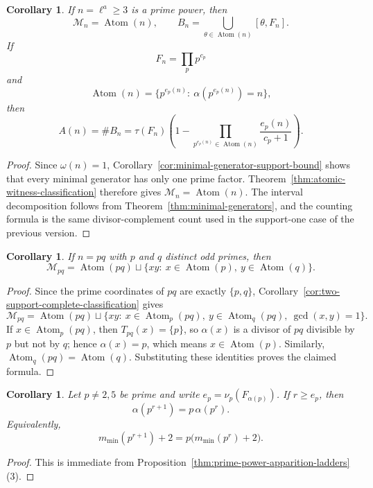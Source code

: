 \documentclass[11pt,letterpaper]{article}
\numberwithin{equation}{section}
\theoremstyle{plain}
\newtheorem{corollary}[theorem]{Corollary}
\theoremstyle{definition}
\theoremstyle{remark}
\DeclareMathOperator{\Atom}{Atom}
\begin{document}
\begin{corollary}
\label{thm:prime-power-minimal-generators}
If $n=\ell^a\ge 3$ is a prime power, then
\[
\mathcal M_n=\Atom(n),
\qquad
B_n=\bigcup_{\theta\in \Atom(n)}[\theta,F_n].
\]
If
\[
F_n=\prod_p p^{c_p}
\]
and
\[
\Atom(n)=\{p^{e_p(n)}:\ \alpha(p^{e_p(n)})=n\},
\]
then
\[
A(n)=\#B_n
=
\tau(F_n)\left(
1-\prod_{p^{e_p(n)}\in\Atom(n)}
\frac{e_p(n)}{c_p+1}
\right).
\]
\end{corollary}

\begin{proof}
Since $\omega(n)=1$, Corollary~\ref{cor:minimal-generator-support-bound} shows
that every minimal generator has only one prime factor. Theorem~\ref{thm:atomic-witness-classification}
therefore gives $\mathcal M_n=\Atom(n)$. The interval decomposition follows
from Theorem~\ref{thm:minimal-generators}, and the counting formula is the same
divisor-complement count used in the support-one case of the previous version.
\end{proof}

\begin{corollary}
\label{thm:odd-semiprime-minimal-generators}
If $n=pq$ with $p$ and $q$ distinct odd primes, then
\[
\mathcal M_{pq}
=
\Atom(pq)
\sqcup
\{xy:\ x\in\Atom(p),\ y\in\Atom(q)\}.
\]
\end{corollary}

\begin{proof}
Since the prime coordinates of $pq$ are exactly $\{p,q\}$,
Corollary~\ref{cor:two-support-complete-classification} gives
\[
\mathcal M_{pq}
=
\Atom(pq)
\sqcup
\{xy:\ x\in\Atom_p(pq),\ y\in\Atom_q(pq),\ \gcd(x,y)=1\}.
\]
If $x\in \Atom_p(pq)$, then $T_{pq}(x)=\{p\}$, so $\alpha(x)$ is a divisor of
$pq$ divisible by $p$ but not by $q$; hence $\alpha(x)=p$, which means
$x\in\Atom(p)$. Similarly, $\Atom_q(pq)=\Atom(q)$. Substituting these
identities proves the claimed formula.
\end{proof}

\begin{corollary}
\label{cor:prime-power-geometric-recursion}
Let $p\neq 2,5$ be prime and write $e_p=\nu_p(F_{\alpha(p)})$. If $r\ge e_p$,
then
\[
\alpha(p^{r+1})=p\,\alpha(p^r).
\]
Equivalently,
\[
m_{\min}(p^{r+1})+2=p\bigl(m_{\min}(p^r)+2\bigr).
\]
\end{corollary}

\begin{proof}
This is immediate from Proposition~\ref{thm:prime-power-apparition-ladders}(3).
\end{proof}
\end{document}
